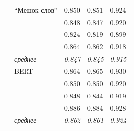 \begin{table}[H]
\begin{center}
\begin{tabular}{|p{3cm}|p{4cm}|p{2.4cm}|p{2.4cm}|p{2.4cm}|}
& ``Мешок слов'' & 0.850 & 0.851 & 0.924 \\
				&& 0.848 & 0.847 & 0.920 \\
				&& 0.824 & 0.819 & 0.899 \\
				&& 0.864 & 0.862 & 0.918 \\
				 & \textit{среднее} & \textit{0.847} & \textit{0.845} & \textit{0.915} \\
		  & BERT & 0.864 & 0.865 & 0.930 \\
				&& 0.850 & 0.850 & 0.920 \\
				&& 0.848 & 0.844 & 0.919 \\
				&& 0.886 & 0.884 & 0.928 \\
				 & \textit{среднее} & \textit{0.862} & \textit{0.861} & \textit{0.924} \\
					
			\hline
		\end{tabular}
	\end{center}
\end{table}

